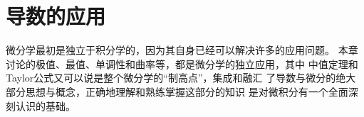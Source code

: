 \setcounter{chapter}{4}

\chapter{导数的应用}

微分学最初是独立于积分学的，因为其自身已经可以解决许多的应用问题。
本章讨论的极值、最值、单调性和曲率等，都是微分学的独立应用，其中
中值定理和Taylor公式又可以说是整个微分学的“制高点”，集成和融汇
了导数与微分的绝大部分思想与概念，正确地理解和熟练掌握这部分的知识
是对微积分有一个全面深刻认识的基础。

% 
% 
% 
% 
% 
% 
% 

